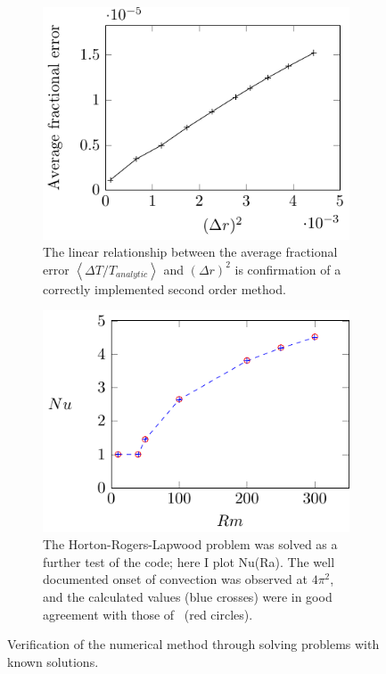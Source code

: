 \documentclass[11pt]{proc}
\begin{document}
\begin{figure}[ht!]
\begin{subfigure}[t]{.48\linewidth}
\centering
\includegraphics[width = \textwidth]{heated-wire-error}
\caption{The linear relationship between the average fractional error $\left<\Delta T/T_{analytic} \right>$ and $(\Delta r)^2$ is confirmation of a correctly implemented second order method.}
\label{fig:heated-wire-error}
\end{subfigure}
\quad
\begin{subfigure}[t]{.48\linewidth}
\centering
\includegraphics[width = \textwidth]{HRL-Nu-comparison}
\caption{The Horton-Rogers-Lapwood problem was solved as a further test of the code; here I plot Nu(Ra). The well documented onset of convection was observed at $4 \pi^2$, and the calculated values (blue crosses) were in good agreement with those of~\citet*{caltagirone-75} (red circles).} 
\label{fig:HRL-Nu-comparison}
\end{subfigure}
\caption{Verification of the numerical method through solving problems with known solutions.}
\label{fig:code-verification}
\end{figure}
\end{document}
